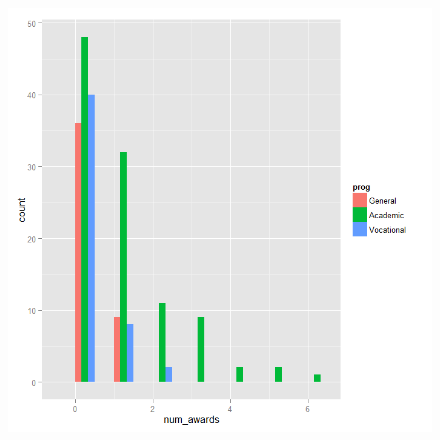 \documentclass[00-GLMregslides.tex]{subfiles}
\begin{document}
%

\begin{frame}
	\begin{figure}
\centering
\includegraphics[width=0.8\linewidth]{poisson1}
\caption{}
\label{fig:poisson1}
\end{figure}

	
\end{frame}
\end{document}
